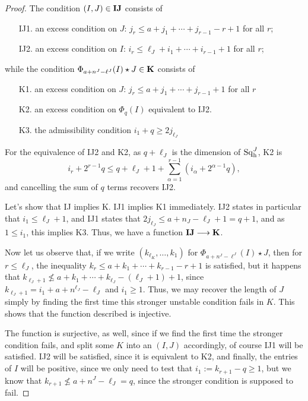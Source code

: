 \documentclass[10pt]{article}
\newcommand{\Sq}{\mathrm{Sq}}
\begin{document}
\begin{CompressingSequencesOfSteenrodOperations}
\begin{proof}
The condition $(I,J)\in\textup{\textbf{IJ}}$ consists of
\begin{enumerate}\squishlist
\setlength{\parindent}{.25in}
\item[IJ1.] an excess condition on $J$: $j_r\leq a+j_1+\cdots +j_{r-1}-r+1$ for all $r$;
\item[IJ2.] an excess condition on $I$: $i_r\leq \ell_J+i_1+\cdots +i_{r-1}+1$ for all $r$;
\end{enumerate}
while the condition $\Phi_{a+n^J-\ell^J}(I)\star J\in\textup{\textbf{K}}$ consists of
\begin{enumerate}\squishlist
\setlength{\parindent}{.25in}
\item[K1.] an excess condition on $J$: $j_r\leq a+j_1+\cdots +j_{r-1}+1$ for all $r$
\item[K2.] an excess condition on $\Phi_q(I)$ equivalent to IJ2.
\item[K3.] the admissibility condition $i_1+q\geq 2j_{\ell_J}$
\end{enumerate}
For the equivalence of IJ2 and K2, as $q+\ell_J$ is the dimension of $\Sq_\textup{h}^J$, K2 is
\[i_r+2^{r-1}q\leq q+\ell_J+1+\sum_{\alpha=1}^{r-1}(i_\alpha+2^{\alpha-1}q),\]
and cancelling the sum of $q$ terms recovers IJ2.

Let's show that IJ implies K. IJ1 implies K1 immediately. IJ2 states in particular that $i_1\leq\ell_J+1$, and IJ1 states that $2j_{\ell_J}\leq a+n_J-\ell_J+1=q+1$, and as $1\leq i_1$, this implies K3. Thus, we have a function $\textbf{\textup{IJ}}\to\textbf{\textup{K}}$.

Now let us observe that, if we write $(k_{\ell_K},\ldots,k_1)$ for $\Phi_{a+n^J-\ell^J}(I)\star J$, then for $r\leq\ell_J$, the inequality
$k_r\leq a+k_1+\cdots +k_{r-1}-r+1$ is satisfied, but it happens that $k_{\ell_J+1}\not\leq a+k_1+\cdots +k_{\ell_J}-(\ell_J+1)+1$, since $k_{\ell_J+1}=i_1+a+n^{\ell_J}-\ell_J$ and $i_1\geq1$. Thus, we may recover the length of $J$ simply by finding the first time this stronger unstable condition fails in $K$. This shows that the function described is injective.

The function is surjective, as well, since if we find the first time the stronger condition fails, and split some $K$ into an $(I,J)$ accordingly, of course IJ1 will be satisfied. IJ2 will be satisfied, since it is equivalent to K2, and finally, the entries of $I$ will be positive, since we only need to test that $i_1:=k_{r+1}-q\geq1$, but we know that $k_{r+1}\not\leq a+n^J-\ell_J=q$, since the stronger condition is supposed to fail.
\end{proof}

\end{CompressingSequencesOfSteenrodOperations}
\end{document}
